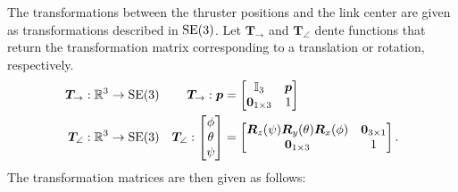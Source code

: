 The transformations between the thruster positions and the link center are given
as transformations described in $\operatorname{SE}(3)$. Let $\bm{T}_{\rightarrow}$ and $\bm{T}_{\angle}$
dente functions that return the transformation matrix corresponding to a translation
or rotation, respectively.
\begin{subequations}
\begin{align}
    \bm{T}_{\rightarrow} : \mathbb{R}^3 &\to \operatorname{SE}(3) 
    &\bm{T}_{\rightarrow} :\bm{p} &= \begin{bmatrix} \mathbb{I}_3 & \bm{p} \\ \bm{0}_{1\times3} & 1 \end{bmatrix} \\
    \bm{T}_{\angle} : \mathbb{R}^3 &\to \operatorname{SE}(3)
    &\bm{T}_{\angle} : \begin{bmatrix}\phi \\ \theta \\ \psi \end{bmatrix} &= \begin{bmatrix}
        \bm{R}_z(\psi) \bm{R}_y(\theta) \bm{R}_x(\phi) & \bm{0}_{3\times1} \\
            \bm{0}_{1\times3} & 1
    \end{bmatrix}.
\end{align}
\end{subequations}
The transformation matrices are then given as follows:

